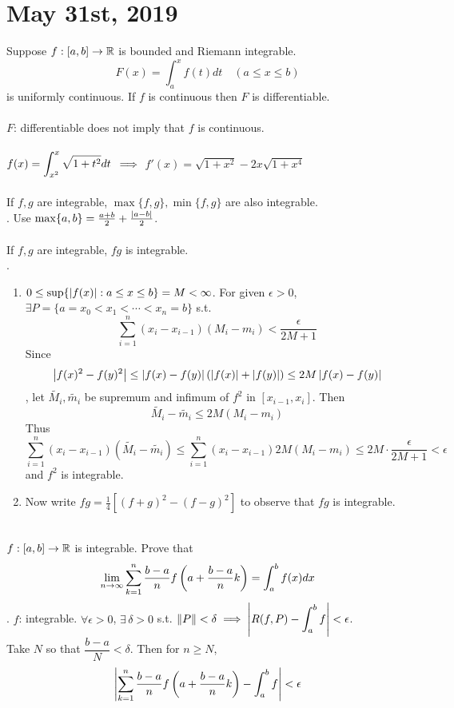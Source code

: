 \section*{May 31st, 2019}
 Suppose $f:[a, b]\rightarrow\mathbb{R}$ is bounded and Riemann integrable.
$$F(x) = \int_a^x f(t)dt \quad (a\leq x\leq b)$$
is uniformly continuous. If $f$ is continuous then $F$ is differentiable.\\
\\
 $F$: differentiable does not imply that $f$ is continuous.\\
\\
 $f(x) = \displaystyle\int_{x^2}^x \sqrt{1+t^2}dt$ $\implies$ $f'(x) = \sqrt{1+x^2}-2x\sqrt{1+x^4}$\\
\\
 If $f, g$ are integrable, $\max\{f, g\}, \min\{f, g\} $ are also integrable.\\
\pf. Use $\max\{a, b\} = \frac{a + b}{2} + \frac{\left|a-b\right|}{2}$.\\
\\
 If $f, g$ are integrable, $fg$ is integrable.\\
\pf.
\begin{enumerate}
	\item $0\leq \sup\{\left|f(x)\right|: a \leq x\leq b\} = M < \infty$. For given $\epsilon>0$, $\exists P = \{a = x_0 < x_1 < \cdots < x_n=b\}$ s.t.
	$$\sum_{i=1}^n(x_{i}-x_{i-1})(M_i-m_i) < \frac{\epsilon}{2M+1}$$
	Since $$\left|f(x)^2 - f(y)^2\right| \leq \left|f(x)-f(y)\right|(\left|f(x)\right| + \left|f(y)\right|) \leq 2M\left|f(x)-f(y)\right|$$
	, let $\tilde{M_i}, \tilde{m_i}$ be supremum and infimum of $f^2$ in $[x_{i-1}, x_i]$. Then $$\tilde{M_i} - \tilde{m_i} \leq 2M(M_i-m_i)$$
	Thus $$ \sum_{i=1}^n(x_{i}-x_{i-1})(\tilde{M_i} - \tilde{m_i}) \leq \sum_{i=1}^n (x_{i} - x_{i-1}) 2M(M_i -m_i) \leq 2M \cdot \frac{\epsilon}{2M+1} < \epsilon $$
	and $f^2$ is integrable.
	\item Now write $fg = \frac{1}{4}[(f+g)^2-(f-g)^2]$ to observe that $fg$ is integrable.
\end{enumerate}~\\
 $f:[a, b]\rightarrow\mathbb{R}$ is integrable. Prove that
$$\lim_{n\rightarrow\infty} \sum_{k=1}^n \frac{b-a}{n}f\left(a + \frac{b-a}{n}k\right) = \int_a^b f(x)dx$$
\pf. $f$: integrable. $\forall \epsilon > 0$, $\exists\,\delta > 0$ s.t. $\left\lVert P\right\rVert < \delta \implies \left|R(f, P) - \displaystyle \int_a^b f\right| < \epsilon$.\\
Take $N$ so that $\dfrac{b-a}{N} < \delta$. Then for $n\geq N$, $$\left|\sum_{k=1}^n \frac{b-a}{n}f\left(a + \frac{b-a}{n}k\right) - \int_a^b f\right| < \epsilon$$
